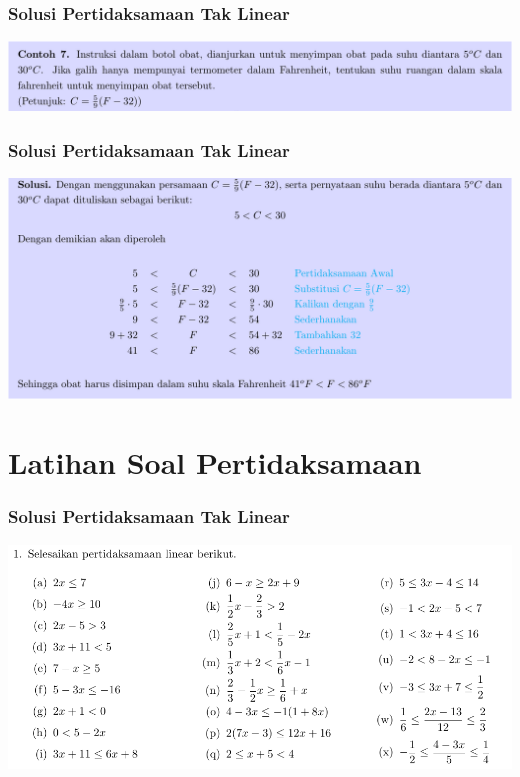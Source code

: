 \documentclass[pdflatex,compress,mathserif]{beamer}
\begin{document}
\begin{frame}
	\frametitle{Solusi Pertidaksamaan Tak Linear}
	\begin{center}
		\includegraphics[width=\linewidth]{img/img16}
	\end{center}
\end{frame}

\begin{frame}
	\frametitle{Solusi Pertidaksamaan Tak Linear}
	\begin{center}
		\includegraphics[width=\linewidth]{img/img17}
	\end{center}
\end{frame}

\section{Latihan Soal Pertidaksamaan}

\begin{frame}
	\frametitle{Solusi Pertidaksamaan Tak Linear}
	\begin{center}
		\includegraphics[width=\linewidth]{img/img18}
	\end{center}
\end{frame}
\end{document}
